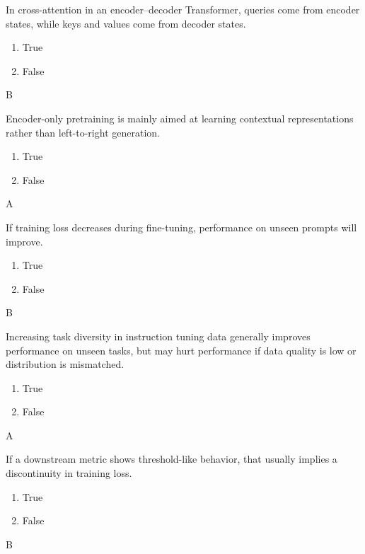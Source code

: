 




\question[2]
In cross-attention in an encoder--decoder Transformer, queries come from encoder states, while keys and values come from decoder states.
\begin{enumerate}
\item True
\item False
\end{enumerate}
\begin{soln}
B
\end{soln}



\question[2]
Encoder-only pretraining is mainly aimed at learning contextual representations rather than left-to-right generation.
\begin{enumerate}
\item True
\item False
\end{enumerate}
\begin{soln}
A
\end{soln}

\question[2]
If training loss decreases during fine-tuning, performance on unseen prompts  will improve.
\begin{enumerate}
\item True
\item False
\end{enumerate}
\begin{soln}
B
\end{soln}


\question[2]
  Increasing task diversity in instruction tuning data generally improves performance on unseen tasks, but may hurt performance if data quality is low or distribution is mismatched.
\begin{enumerate}
\item True
\item False
\end{enumerate}
\begin{soln}
A
\end{soln}


\question[2]
If a downstream metric shows threshold-like behavior, that usually implies a discontinuity in training loss.
\begin{enumerate}
\item True
\item False
\end{enumerate}
\begin{soln}
B
\end{soln}

